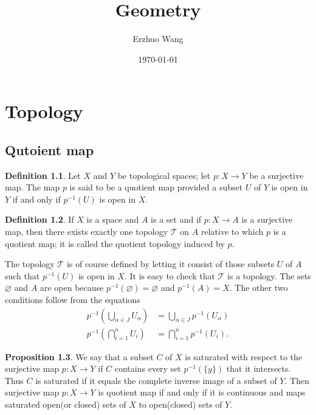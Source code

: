 \documentclass[12pt,a4paper]{book}
\theoremstyle{definition}
\newtheorem{defn}{Definition}[section]
\newtheorem{prop}[defn]{Proposition}
\begin{document}
\title{Geometry}
\author{Erzhuo Wang}
\date{\today}
\maketitle %
\tableofcontents



\newpage
\chapter{Topology}
\section{Qutoient map}
\begin{defn}
    Let $X$ and $Y$ be topological spaces; let $p: X \rightarrow Y$ be a surjective map. The map $p$ is said to be a quotient map provided a subset $U$ of $Y$ is open in $Y$ if and only if $p^{-1}(U)$ is open in $X$.
\end{defn}
\begin{defn}
    If $X$ is a space and $A$ is a set and if $p: X \rightarrow A$ is a surjective map, then there exists exactly one topology $\mathcal{T}$ on $A$ relative to which $p$ is a quotient map; it is called the quotient topology induced by $p$.

    The topology $\mathcal{T}$ is of course defined by letting it consist of those subsets $U$ of $A$ such that $p^{-1}(U)$ is open in $X$. It is easy to check that $\mathcal{T}$ is a topology. The sets $\varnothing$ and $A$ are open because $p^{-1}(\varnothing)=\varnothing$ and $p^{-1}(A)=X$. The other two conditions follow from the equations
    $$
        \begin{aligned}
            p^{-1}\left(\bigcup_{\alpha \in J} U_\alpha\right) & =\bigcup_{\alpha \in J} p^{-1}\left(U_\alpha\right) \\
            p^{-1}\left(\bigcap_{i=1}^n U_i\right)             & =\bigcap_{i=1}^n p^{-1}\left(U_i\right) .
        \end{aligned}
    $$
\end{defn}
\begin{prop}
    We say that a subset $C$ of $X$ is saturated with respect to the surjective map $p: X \rightarrow Y$  if $C$ contains every set $p^{-1}(\{y\})$ that it intersects. Thus $C$ is saturated if it equals the complete inverse image of a subset of $Y$.
    Then surjective map $p: X \rightarrow Y$ is quotient map if and only if it is continuous and maps saturated open(or closed) sets of $X$ to open(closed) sets of $Y$.
\end{prop}
\end{document}

